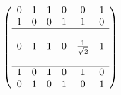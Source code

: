 \documentclass{article}
\begin{document}
\[ \left(\begin{array}{*6{c}}
0 & 1 & 1 & 0 & 0 & 1 \\
1 & 0 & 0 & 1 & 1 & 0 \\\hline
\noalign{\vspace{12pt}}
0 & 1 & 1 & 0 & \frac{1}{\sqrt{2}} & 1\\
\noalign{\vspace{12pt}}\hline
1 & 0 & 1 & 0 & 1 & 0 \\
0 & 1 & 0 & 1 & 0 & 1 \\
\end{array}\right) \]
\end{document}
